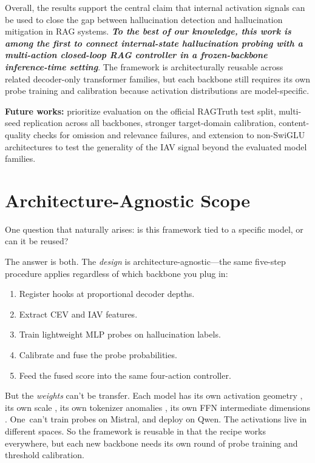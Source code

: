 \vspace{0.3cm}
Overall, the results support the central claim that internal activation signals can be used to close the gap between hallucination detection and hallucination mitigation in RAG systems. \textbf{\textit{To the best of our knowledge, this work is among the first to connect internal-state hallucination probing with a multi-action closed-loop RAG controller in a frozen-backbone inference-time setting}}. The framework is architecturally reusable across related decoder-only transformer families, but each backbone still requires its own probe training and calibration because activation distributions are model-specific.

\vspace{0.5cm}
\textbf{Future works:}  prioritize evaluation on the official RAGTruth test split, multi-seed replication across all backbones, stronger target-domain calibration, content-quality checks for omission and relevance failures, and extension to non-SwiGLU architectures to test the generality of the IAV signal beyond the evaluated model families.

\section{Architecture-Agnostic Scope}
\label{sec:agnostic_scope}

One question that naturally arises: is this framework tied to a specific model, or can it be reused?

The answer is both. The \emph{design} is architecture-agnostic—the same five-step procedure applies regardless of which backbone you plug in:

\begin{enumerate}
    \item Register hooks at proportional decoder depths.
    \item Extract CEV and IAV features.
    \item Train lightweight MLP probes on hallucination labels.
    \item Calibrate and fuse the probe probabilities.
    \item Feed the fused score into the same four-action controller.
\end{enumerate}

\noindent But the \emph{weights} can't be transfer. Each model has its own activation geometry , its own scale , its own tokenizer anomalies , its own FFN intermediate dimensions . One can't train probes on Mistral, and deploy on Qwen. The activations live in different spaces. So the framework is reusable in that the recipe works everywhere, but each new backbone needs its own round of probe training and threshold calibration.

